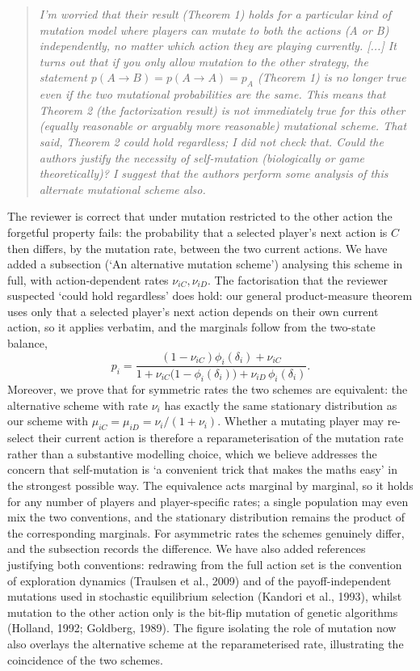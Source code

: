 \documentclass[11pt]{article}
\newenvironment{reviewerquote}
  {\begin{quote}\itshape}
  {\end{quote}}
\begin{document}
\begin{reviewerquote}
I'm worried that their result (Theorem 1) holds for a particular kind of
mutation model where players can mutate to both the actions (A or B)
independently, no matter which action they are playing currently. [...] It
turns out that if you only allow mutation to the other strategy, the
statement \(p(A\to B)=p(A\to A)=p_A\) (Theorem 1) is no longer true even if
the two mutational probabilities are the same. This means that Theorem 2 (the
factorization result) is not immediately true for this other (equally
reasonable or arguably more reasonable) mutational scheme. That said, Theorem
2 could hold regardless; I did not check that. Could the authors justify the
necessity of self-mutation (biologically or game theoretically)? I suggest
that the authors perform some analysis of this alternate mutational scheme
also.
\end{reviewerquote}

The reviewer is correct that under mutation restricted to the other action
the forgetful property fails: the probability that a selected player's next
action is \(C\) then differs, by the mutation rate, between the two current
actions. We have added a subsection (`An alternative mutation scheme')
analysing this scheme in full, with action-dependent rates
\(\nu_{iC},\nu_{iD}\). The factorisation that the reviewer suspected `could
hold regardless' does hold: our general product-measure theorem uses only
that a selected player's next action depends on their own current action, so
it applies verbatim, and the marginals follow from the two-state balance,
\[
  p_i = \frac{(1-\nu_{iC})\phi_i(\delta_i)+\nu_{iC}}
             {1+\nu_{iC}\bigl(1-\phi_i(\delta_i)\bigr)
               +\nu_{iD}\,\phi_i(\delta_i)}.
\]
Moreover, we prove that for symmetric rates the two schemes are equivalent:
the alternative scheme with rate \(\nu_i\) has exactly the same stationary
distribution as our scheme with \(\mu_{iC}=\mu_{iD}=\nu_i/(1+\nu_i)\).
Whether a mutating player may re-select their current action is therefore a
reparameterisation of the mutation rate rather than a substantive modelling
choice, which we believe addresses the concern that self-mutation is `a
convenient trick that makes the maths easy' in the strongest possible way.
The equivalence acts marginal by marginal, so it holds for any number of
players and player-specific rates; a single population may even mix the two
conventions, and the stationary distribution remains the product of the
corresponding marginals.
For asymmetric rates the schemes genuinely differ, and the subsection
records the difference. We have also added references justifying both
conventions: redrawing from the full action set is the convention of
exploration dynamics (Traulsen et al., 2009) and of the payoff-independent
mutations used in stochastic equilibrium selection (Kandori et al., 1993),
whilst mutation to the other action only is the bit-flip mutation of genetic
algorithms (Holland, 1992; Goldberg, 1989). The figure isolating the role of
mutation now also overlays the alternative scheme at the reparameterised
rate, illustrating the coincidence of the two schemes.
\end{document}
